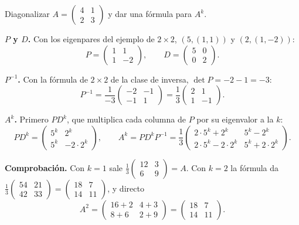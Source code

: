 \documentclass[11pt,letterpaper]{article}
\begin{document}
\begin{ejemplo}
    Diagonalizar $A = \begin{pmatrix} 4 & 1 \\ 2 & 3 \end{pmatrix}$ y
    dar una fórmula para $A^k$.

    \textbf{$P$ y $D$.} Con los eigenpares del ejemplo de
    $2 \times 2$, $(5, (1, 1))$ y $(2, (1, -2))$:
    \[
        P = \begin{pmatrix} 1 & 1 \\ 1 & -2 \end{pmatrix} ,
        \qquad
        D = \begin{pmatrix} 5 & 0 \\ 0 & 2 \end{pmatrix} .
    \]

    \textbf{$P^{-1}$.} Con la fórmula de $2 \times 2$ de la clase de
    inversa, $\det P = -2 - 1 = -3$:
    \[
        P^{-1} = \frac{1}{-3}
        \begin{pmatrix} -2 & -1 \\ -1 & 1 \end{pmatrix}
        = \frac{1}{3} \begin{pmatrix} 2 & 1 \\ 1 & -1 \end{pmatrix} .
    \]

    \textbf{$A^k$.} Primero $PD^k$, que multiplica cada columna de $P$
    por su eigenvalor a la $k$:
    \[
        PD^k = \begin{pmatrix} 5^k & 2^k \\ 5^k & -2 \cdot 2^k
        \end{pmatrix} ,
        \qquad
        A^k = PD^kP^{-1} = \frac{1}{3}
        \begin{pmatrix}
            2 \cdot 5^k + 2^k & 5^k - 2^k \\
            2 \cdot 5^k - 2 \cdot 2^k & 5^k + 2 \cdot 2^k
        \end{pmatrix} .
    \]

    \textbf{Comprobación.} Con $k = 1$ sale
    $\tfrac{1}{3}\left(\begin{smallmatrix} 12 & 3 \\ 6 & 9
    \end{smallmatrix}\right) = A$. Con $k = 2$ la fórmula da
    $\tfrac{1}{3}\left(\begin{smallmatrix} 54 & 21 \\ 42 & 33
    \end{smallmatrix}\right)
    = \left(\begin{smallmatrix} 18 & 7 \\ 14 & 11
    \end{smallmatrix}\right)$, y directo
    \[
        A^2 = \begin{pmatrix} 16 + 2 & 4 + 3 \\ 8 + 6 & 2 + 9
        \end{pmatrix}
        = \begin{pmatrix} 18 & 7 \\ 14 & 11 \end{pmatrix} .
    \]
\end{ejemplo}
\end{document}
